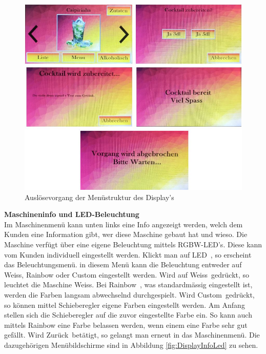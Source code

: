 \begin{figure}[H]
	\centering
	\includegraphics[width=\textwidth]{graphics/DisplayAusloesen}
	\caption{Auslösevorgang der Menüstruktur des Display's \cite{pngimgcom_cocktail_nodate-6}}
	\label{fig:DisplayAusloesen}
\end{figure}

\newpage

\textbf{Maschineninfo und LED-Beleuchtung}\\
Im Maschinenmenü kann unten links eine Info angezeigt werden, welch dem Kunden eine Information gibt, wer diese Maschine gebaut hat und wieso. Die Maschine verfügt über eine eigene Beleuchtung mittels RGBW-LED's. Diese kann vom Kunden individuell eingestellt werden. Klickt man auf \flqq LED\frqq~, so erscheint das Beleuchtungsmenü. in diesem Menü kann die Beleuchtung entweder auf Weiss, Rainbow oder Custom eingestellt werden. Wird auf \flqq Weiss\frqq~gedrückt, so leuchtet die Maschine Weiss. Bei \flqq Rainbow\frqq~, was standardmässig eingestellt ist, werden die Farben langsam abwechselnd durchgespielt. Wird \flqq Custom\frqq~gedrückt, so können mittel Schieberegler eigene Farben eingestellt werden. Am Anfang stellen sich die Schieberegler auf die zuvor eingestellte Farbe ein. So kann auch mittels Rainbow eine Farbe belassen werden, wenn einem eine Farbe sehr gut gefällt. Wird \flqq Zurück\frqq~betätigt, so gelangt man erneut in das Maschinenmenü. Die dazugehörigen Menübildschirme sind in Abbildung \ref{fig:DisplayInfoLed} zu sehen.

